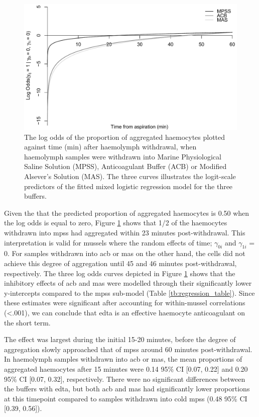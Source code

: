 \begin{figure}[!ht]
    \centering
    \includegraphics[width=1.0\textwidth]{figures/Method development/Log Odds plot.pdf}
    \caption{The log odds of the proportion of aggregated haemocytes plotted against time (min) after haemolymph withdrawal, when haemolymph samples were withdrawn into Marine Physiological Saline Solution (MPSS), Anticoagulant Buffer (ACB) or Modified Alsever's Solution (MAS). The three curves illustrates the logit-scale predictors of the fitted mixed logistic regression model for the three buffers.}
    \label{fig:LogOdds}
\end{figure}

Given the that the predicted proportion of aggregated haemocytes is 0.50 when the log odds is equal to zero, Figure \ref{fig:LogOdds} shows that 1/2 of the haemocytes withdrawn into \acrshort{mpss} had aggregated within 23 minutes post-withdrawal. This interpretation is valid for mussels where the random effects of time; $\gamma_{0i}$ and $\gamma_{1i}$ = 0. For samples withdrawn into \acrshort{acb} or \acrshort{mas} on the other hand, the cells did not achieve this degree of aggregation until 45 and 46 minutes post-withdrawal, respectively. The three log odds curves depicted in Figure \ref{fig:LogOdds} shows that the inhibitory effects of \acrshort{acb} and \acrshort{mas} were modelled through their significantly lower y-intercepts compared to the \acrshort{mpss} sub-model (Table \ref{tb:regression_table}). Since these estimates were significant after accounting for within-mussel correlations (<.001), we can conclude that \acrshort{edta} is an effective haemocyte anticoagulant on the short term.

The effect was largest during the initial 15-20 minutes, before the degree of aggregation slowly approached that of \acrshort{mpss} around 60 minutes post-withdrawal. In haemolymph samples withdrawn into \acrshort{acb} or \acrshort{mas}, the mean proportions of aggregated haemocytes after 15 minutes were 0.14 95\% CI [0.07, 0.22] and  0.20 95\% CI [0.07, 0.32], respectively. There were no significant differences between the buffers with \acrshort{edta}, but both \acrshort{acb} and \acrshort{mas} had significantly lower proportions at this timepoint compared to samples withdrawn into cold \acrshort{mpss} (0.48 95\% CI [0.39, 0.56]).

